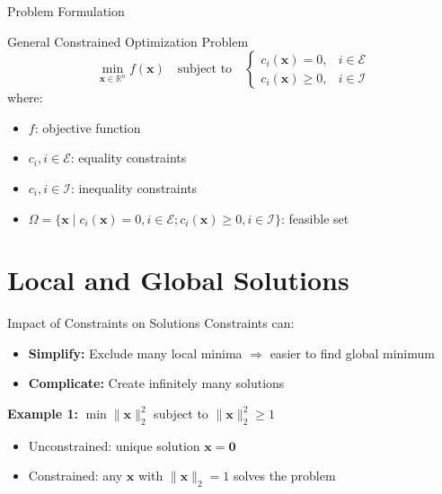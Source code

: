 \documentclass[aspectratio=1610]{beamer}
\begin{document}
\begin{frame}{Problem Formulation}
  \begin{block}{General Constrained Optimization Problem}
    $$\min_{\mathbf{x} \in \mathbb{R}^{n}} f(\mathbf{x}) \quad \text{subject to} \quad \begin{cases}
    c_{i}(\mathbf{x})=0, & i \in \mathcal{E} \\
    c_{i}(\mathbf{x}) \geq 0, & i \in \mathcal{I}
    \end{cases}$$
    where:
    \begin{itemize}
      \item $f$: objective function
      \item $c_i, i \in \mathcal{E}$: equality constraints  
      \item $c_i, i \in \mathcal{I}$: inequality constraints
      \item $\Omega = \{\mathbf{x} \mid c_i(\mathbf{x}) = 0, i \in \mathcal{E}; c_i(\mathbf{x}) \geq 0, i \in \mathcal{I}\}$: feasible set
    \end{itemize}
  \end{block}
\end{frame}

\section{Local and Global Solutions}
\begin{frame}{Impact of Constraints on Solutions}
  Constraints can:
  \begin{itemize}
    \item \textbf{Simplify:} Exclude many local minima $\Rightarrow$ easier to find global minimum
    \item \textbf{Complicate:} Create infinitely many solutions
  \end{itemize}
  
  \vspace{0.3cm}
  \textbf{Example 1:} $\min \|\mathbf{x}\|_2^2$ subject to $\|\mathbf{x}\|_2^2 \geq 1$
  \begin{itemize}
    \item Unconstrained: unique solution $\mathbf{x} = \mathbf{0}$
    \item Constrained: any $\mathbf{x}$ with $\|\mathbf{x}\|_2 = 1$ solves the problem
  \end{itemize}
\end{frame}
\end{document}
